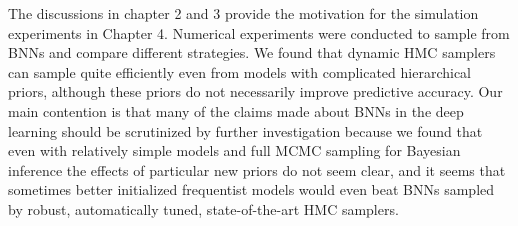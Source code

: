 \documentclass[12pt]{report}
\begin{document}
The discussions in chapter 2 and 3 provide the motivation for the simulation experiments in Chapter 4. Numerical experiments were conducted to sample from BNNs and compare different strategies. We found that dynamic HMC samplers can sample quite efficiently even from models with complicated hierarchical priors, although these priors do not necessarily improve predictive accuracy. Our main contention is that many of the claims made about BNNs in the deep learning should be scrutinized by further investigation because we found that even with relatively simple models and full MCMC sampling for Bayesian inference the effects of particular new priors do not seem clear, and it seems that sometimes better initialized frequentist models would even beat BNNs sampled by robust, automatically tuned, state-of-the-art HMC samplers.




\end{document}

